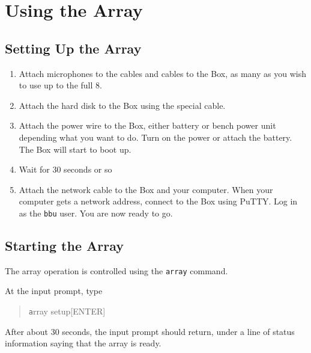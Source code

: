 \documentclass[12pt]{article}
\begin{document}
\section{Using the Array}

\subsection{Setting Up the Array}

\begin{enumerate}

   \item  Attach microphones to the cables and cables to the Box, as
        many as you wish to use up to the full 8.

   \item  Attach the hard disk to the Box using the special cable.

   \item  Attach the power wire to the Box, either battery or bench
        power unit depending what you want to do.  Turn on the power
        or attach the battery.  The Box will start to boot up.

   \item  Wait for 30 seconds or so

   \item  Attach the network cable to the Box and your computer.  When
        your computer gets a network address, connect to the Box using
        PuTTY.  Log in as the \texttt{bbu} user.  You are now ready to go.

\end{enumerate}

\subsection{Starting the Array}

The array operation is controlled using the \texttt{array} command.

At the input prompt, type
\begin{quotation}\texttt
      array setup[ENTER]
\end{quotation}
After about 30 seconds, the input prompt should return, under a line
of status information saying that the array is ready.
\end{document}
